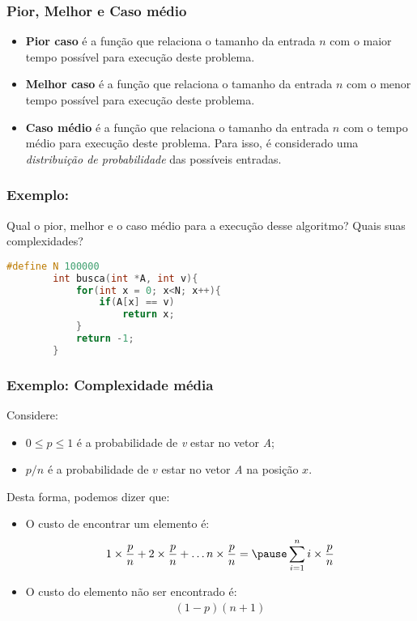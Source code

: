 \documentclass[10pt]{beamer}
\begin{document}
\begin{frame}[t]
    \frametitle{Pior, Melhor e Caso médio}
    \begin{itemize}
        \item \textbf{Pior caso} é a função que relaciona o tamanho da entrada $n$ com o maior tempo possível para execução deste problema.
        \item \textbf{Melhor caso} é a função que relaciona o tamanho da entrada $n$ com o menor tempo possível para execução deste problema.
        \item \textbf{Caso médio} é a função que relaciona o tamanho da entrada $n$ com o tempo médio para execução deste problema. Para isso, é considerado uma \emph{distribuição de probabilidade} das possíveis entradas.
    \end{itemize}

\end{frame}

\begin{frame}[fragile, t]
    \frametitle{Exemplo: }
    Qual o pior, melhor e o caso médio para a execução desse algoritmo? Quais suas complexidades?

    \begin{lstlisting}[language=C++, basicstyle=\small]
        #define N 100000
        int busca(int *A, int v){
            for(int x = 0; x<N; x++){
                if(A[x] == v)
                    return x;
            }
            return -1;
        }
    \end{lstlisting}
\end{frame}

\begin{frame}
    \frametitle{Exemplo: Complexidade média}
    Considere:
    \begin{itemize}
        \item $0\leq p\leq 1$ é a probabilidade de \emph{v} estar no vetor \emph{A};
        \item $p/n$ é a probabilidade de $v$ estar no vetor \emph{A} na posição $x$.
    \end{itemize}

    \pause Desta forma, podemos dizer que:
    \begin{itemize}
        \item O custo de encontrar um elemento é:
              \begin{align}\label{Eq1}
                  1\times \frac{p}{n} + 2\times \frac{p}{n} +\ldots n\times \frac{p}{n}= \pause \sum_{i=1}^n i\times \frac{p}{n}
              \end{align}
              \item O custo do elemento não ser encontrado é:
              \begin{align}\label{Eq2}
                  (1-p) (n+1)
              \end{align}
    \end{itemize}
\end{frame}
\end{document}
